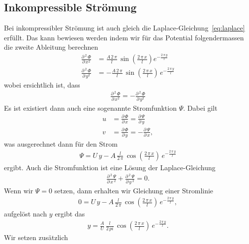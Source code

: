 \subsection{Inkompressible Strömung}
Bei inkompressibler Strömung ist auch gleich die
Laplace-Gleichung~\ref{eq:laplace} erfüllt.
Das kann bewiesen werden indem wir für das Potential
folgendermassen die zweite Ableitung berechnen
\begin{align*}
    \frac{\partial\,^2\,\Phi}{\partial\,x^2}
    &= \frac{A\,2\,\pi}{l}\,\sin\left(\frac{2\,\pi\,x}{l}\right)
    e^{-\frac{2\,\pi\,y}{l}} \\
    \frac{\partial\,^2\,\Phi}{\partial\,y^2}
    &= -\frac{A\,2\,\pi}{l}\,\sin\left(\frac{2\,\pi\,x}{l}\right)
    \,e^{-\frac{2\,\pi\,y}{l}}
\end{align*}
wobei ersichtlich ist, dass
\begin{align*}
    \frac{\partial\,^2\,\Phi}{\partial\,x^2}
    =
    -\frac{\partial\,^2\,\Phi}{\partial\,y^2}
\end{align*}
Es ist existiert dann auch eine sogenannte Stromfunktion $\Psi$.
Dabei gilt
\begin{align*}
    u 
    &=
    \frac{\partial\,\Phi}{\partial\,x}
    =
    \frac{\partial\,\Psi}{\partial\,y}
    \\
    v
    &=
    \frac{\partial\,\Phi}{\partial\,y}
    =
    -\frac{\partial\,\Psi}{\partial\,x},
\end{align*}
was ausgerechnet dann für den Strom
\begin{align*}
    \Psi
    =
    U\,y - A\,\frac{l}{2\,\pi}\,\cos\left(\frac{2\,\pi\,x}{l}\right)
    \,e^{-\frac{2\,\pi\,y}{l}}
\end{align*}
ergibt.
Auch die Stromfunktion ist eine Lösung der Laplace-Gleichung
\begin{align*}
    \frac{\partial\,^2\,\Psi}{\partial\,x\,^2}
    +
    \frac{\partial\,^2\,\Psi}{\partial\,y\,^2}
    =
    0.
\end{align*}
Wenn wir $\Psi = 0$ setzen, dann erhalten wir Gleichung
einer Stromlinie
\begin{align*}
    0 = U\,y - A\,\frac{l}{2\,\pi}\,
    \cos\left(\frac{2\,\pi\,x}{l}\right)\,
    e^{-\frac{2\,\pi\,y}{l}},
\end{align*}
aufgelöst nach $y$ ergibt das
\begin{align*}
    y
    =
    \frac{A}{U}\,\frac{l}{2\,pi}\,
    \cos\left(\frac{2\,\pi\,x}{l}\right)\,
    e^{-\frac{2\,\pi\,y}{l}}.
\end{align*}
Wir setzen zusätzlich 
